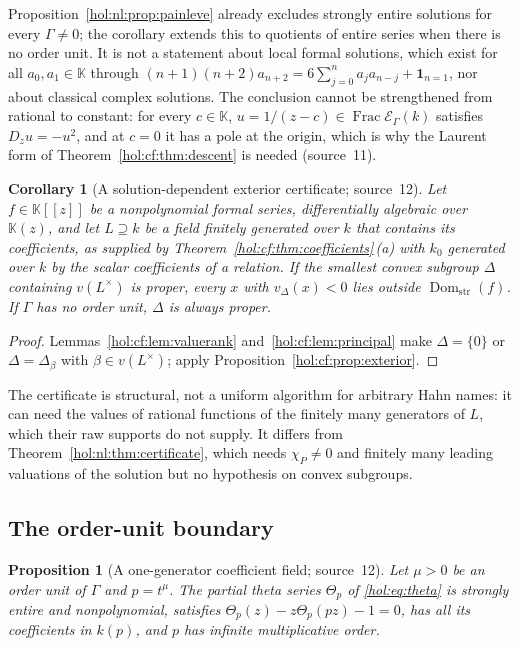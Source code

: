 \documentclass[11pt]{article}
\numberwithin{equation}{section}
\newtheorem{proposition}[theorem]{Proposition}
\newtheorem{corollary}[theorem]{Corollary}
\theoremstyle{definition}
\theoremstyle{remark}
\newcommand{\Dom}{\operatorname{Dom}_{\mathrm{str}}}
\newcommand{\KK}{\mathbb K}
\newcommand{\EK}{\mathcal E_\Gamma(k)}
\newcommand{\FE}{\operatorname{Frac}\EK}
\begin{document}
Proposition~\ref{hol:nl:prop:painleve} already excludes strongly entire
solutions for every $\Gamma\ne0$; the corollary extends this to quotients of
entire series when there is no order unit. It is not a statement about local
formal solutions, which exist for all $a_0,a_1\in\KK$ through
$(n+1)(n+2)a_{n+2}=6\sum_{j=0}^na_ja_{n-j}+\mathbf 1_{n=1}$, nor about
classical complex solutions. The conclusion cannot be strengthened from
rational to constant: for every $c\in\KK$, $u=1/(z-c)\in\FE$ satisfies
$D_zu=-u^2$, and at $c=0$ it has a pole at the origin, which is why the Laurent
form of Theorem~\ref{hol:cf:thm:descent} is needed (source~11).

\begin{corollary}[A solution-dependent exterior certificate; source~12]
\label{hol:cf:cor:DAexterior}
Let $f\in\KK[[z]]$ be a nonpolynomial formal series, differentially algebraic
over $\KK(z)$, and let $L\supseteq k$ be a field finitely generated over $k$
that contains its coefficients, as supplied by
Theorem~\ref{hol:cf:thm:coefficients}\,(a) with $k_0$ generated over $k$ by
the scalar coefficients of a relation. If the smallest convex subgroup
$\Delta$ containing $v(L^\times)$ is proper, every $x$ with $v_\Delta(x)<0$ lies
outside $\Dom(f)$. If $\Gamma$ has no order unit, $\Delta$ is always proper.
\end{corollary}

\begin{proof}
Lemmas~\ref{hol:cf:lem:valuerank} and~\ref{hol:cf:lem:principal} make
$\Delta=\{0\}$ or $\Delta=\Delta_\beta$ with $\beta\in v(L^\times)$; apply
Proposition~\ref{hol:cf:prop:exterior}.
\end{proof}

The certificate is structural, not a uniform algorithm for arbitrary Hahn
names: it can need the values of rational functions of the finitely many
generators of $L$, which their raw supports do not supply. It differs from
Theorem~\ref{hol:nl:thm:certificate}, which needs $\chi_P\ne0$ and finitely
many leading valuations of the solution but no hypothesis on convex
subgroups.

\subsection{The order-unit boundary}\label{hol:cf:sub:sharp}

\begin{proposition}[A one-generator coefficient field; source~12]
\label{hol:cf:prop:theta}
Let $\mu>0$ be an order unit of $\Gamma$ and $p=t^\mu$. The partial theta
series $\Theta_p$ of \eqref{hol:eq:theta} is strongly entire and
nonpolynomial, satisfies $\Theta_p(z)-z\Theta_p(pz)-1=0$, has all its
coefficients in $k(p)$, and $p$ has infinite multiplicative order.
\end{proposition}
\end{document}
